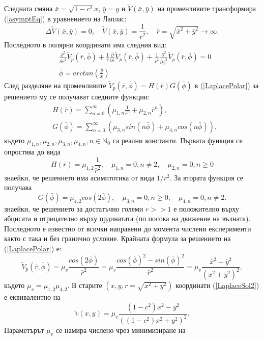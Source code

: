 \documentclass{article}
\newcommand{\be}{\begin{equation}}
\newcommand{\ee}{\end{equation}}
\newcommand{\rf}[1]{(\ref{#1})}
\begin{document}
Следната смяна $\bar x  = \sqrt{1-c^2} x$, $\bar y = y$ и $\tilde V (\bar x, \bar y)$ на променливите трансформира \rf{asymptEq} в уравнението на Лаплас:
\be\label{LaplaceEq}
\Delta \tilde V(\bar x, \bar y) = 0, \quad \tilde V(\bar x, \bar y) = \frac{1}{\bar r^2}, \quad \bar r = \sqrt{\bar x^2 + \bar y^2} \rightarrow \infty.
\ee
Последното в полярни координати има следния вид:
\begin{align}\label{LaplacePolar}
&\frac{\partial^2}{\partial \bar r^2} \tilde V_p(\bar r,\bar \phi) + \frac{1}{\bar r} \frac{\partial}{\partial \bar r} \tilde V_p(\bar r, \bar \phi) + \frac{1}{\bar r^2} \frac{\partial^2}{\partial \bar \phi^2} \tilde V_p(\bar r, \bar \phi) = 0 \\
&\bar \phi = arctan(\frac{\bar y}{\bar x}) \nonumber
\end{align}
След разделяне на променливите $\tilde V_p(\bar r, \bar \phi) = H(\bar r) G(\bar \phi)$ в \rf{LaplacePolar} за решението му се получават следните функции:
\begin{align}\label{LaplaceSol}
&H(\bar{r}) = \sum^{\infty}_{n=0} (\mu_{1,n} \frac{1}{ \bar{r}^n} + \mu_{2,n} \bar{r}^n ),
\\ \nonumber &G(\bar \phi) = \sum^{\infty}_{n=0} (\mu_{3,n}sin(n \bar \phi ) + \mu_{4,n}cos(n \bar \phi)),
\end{align}
където $\mu_{1,n}, \mu_{2,n}, \mu_{3,n}, \mu_{4,n}, n \in \mathbb{N}_{0}$ са реални константи. Първата функция се опростява до вида
\be
H(\bar r) = \mu_{1,2}\frac{1}{\bar r^2}, \quad \mu_{1,n} = 0, n \neq 2, \quad \mu_{2,n} = 0, n \ge 0
\ee
знаейки, че решението има асимптотика от вида $1/r^2$. За втората функция се получава
\be
G(\bar \phi) = \mu_{4,2}cos(2 \bar \phi), \quad \mu_{3,n} = 0, n \ge 0, \quad \mu_{4,n} = 0, n \neq 2.
\ee
знаейки, че решението за достатъчно големи $r >> 1$ е положително върху абцисата и отрицателно върху ординатата (по посока на движение на вълната). Последното е известно от всички направени до момента числени експерименти както с така и без гранично условие. Крайната формула за решението на \rf{LaplacePolar} е:
\be \label{LaplaceSol2}
\tilde V_p(\bar r, \bar \phi) = \mu_v \frac{ cos(2 \bar \phi) }{ \bar r^2 } = \mu_v \frac{ cos(\bar \phi)^2 - sin(\bar \phi)^2 }{ \bar r^2 } = \mu_v \frac{ \bar x^2 - \bar y^2 }{ (\bar x^2 + \bar y^2)^2 },
\ee
където $\mu_v = \mu_{1,2} \mu_{4,2}$. В старите $(x, y, r=\sqrt{x^2+y^2})$ координати \rf{LaplaceSol2} е еквивалентно на 
\be\label{bndv}
\tilde v(x, y) = \mu_v \frac{ (1-c^2) x^2 - y^2 }{ ((1-c^2) x^2 + y^2)^2 }.
\ee
Параметърът $\mu_v$ се намира числено чрез минимизиране на 
\end{document}
